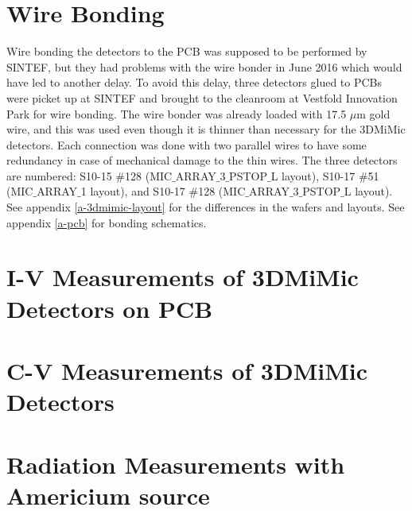 \documentclass[../main/thesis.tex]{subfiles}
\begin{document}
\section{Wire Bonding}
Wire bonding the detectors to the PCB was supposed to be performed by SINTEF, but they had problems with the wire bonder in June 2016 which would have led to another delay. To avoid this delay, three detectors glued to PCBs were picket up at SINTEF and brought to the cleanroom at Vestfold Innovation Park for wire bonding. The wire bonder was already loaded with 17.5 $\mu$m gold wire, and this was used even though it is thinner than necessary for the 3DMiMic detectors. Each connection was done with two parallel wires to have some redundancy in case of mechanical damage to the thin wires. The three detectors are numbered: S10-15 $\#$128 (MIC$\_$ARRAY$\_$3$\_$PSTOP$\_$L layout), S10-17 $\#$51 (MIC$\_$ARRAY$\_$1 layout), and S10-17 $\#$128 (MIC$\_$ARRAY$\_$3$\_$PSTOP$\_$L layout). See appendix \ref{a-3dmimic-layout} for the differences in the wafers and layouts.
See appendix \ref{a-pcb} for bonding schematics. 

\section{I-V Measurements of 3DMiMic Detectors on PCB}

\section{C-V Measurements of 3DMiMic Detectors}

\section{Radiation Measurements with Americium source}
\end{document}
